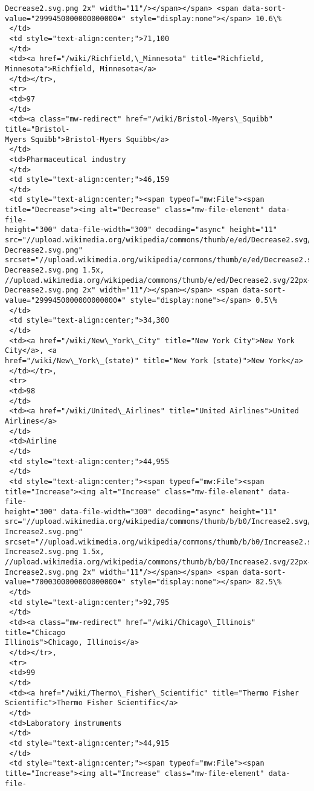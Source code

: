 \documentclass[11pt]{article}
\begin{document}
\begin{tcolorbox}[breakable, size=fbox, boxrule=.5pt, pad at break*=1mm, opacityfill=0]
\begin{Verbatim}[commandchars=\\\{\}]
Decrease2.svg.png 2x" width="11"/></span></span> <span data-sort-
value="2999450000000000000♠" style="display:none"></span> 10.6\%
 </td>
 <td style="text-align:center;">71,100
 </td>
 <td><a href="/wiki/Richfield,\_Minnesota" title="Richfield,
Minnesota">Richfield, Minnesota</a>
 </td></tr>,
 <tr>
 <td>97
 </td>
 <td><a class="mw-redirect" href="/wiki/Bristol-Myers\_Squibb" title="Bristol-
Myers Squibb">Bristol-Myers Squibb</a>
 </td>
 <td>Pharmaceutical industry
 </td>
 <td style="text-align:center;">46,159
 </td>
 <td style="text-align:center;"><span typeof="mw:File"><span
title="Decrease"><img alt="Decrease" class="mw-file-element" data-file-
height="300" data-file-width="300" decoding="async" height="11"
src="//upload.wikimedia.org/wikipedia/commons/thumb/e/ed/Decrease2.svg/11px-
Decrease2.svg.png"
srcset="//upload.wikimedia.org/wikipedia/commons/thumb/e/ed/Decrease2.svg/17px-
Decrease2.svg.png 1.5x,
//upload.wikimedia.org/wikipedia/commons/thumb/e/ed/Decrease2.svg/22px-
Decrease2.svg.png 2x" width="11"/></span></span> <span data-sort-
value="2999450000000000000♠" style="display:none"></span> 0.5\%
 </td>
 <td style="text-align:center;">34,300
 </td>
 <td><a href="/wiki/New\_York\_City" title="New York City">New York City</a>, <a
href="/wiki/New\_York\_(state)" title="New York (state)">New York</a>
 </td></tr>,
 <tr>
 <td>98
 </td>
 <td><a href="/wiki/United\_Airlines" title="United Airlines">United Airlines</a>
 </td>
 <td>Airline
 </td>
 <td style="text-align:center;">44,955
 </td>
 <td style="text-align:center;"><span typeof="mw:File"><span
title="Increase"><img alt="Increase" class="mw-file-element" data-file-
height="300" data-file-width="300" decoding="async" height="11"
src="//upload.wikimedia.org/wikipedia/commons/thumb/b/b0/Increase2.svg/11px-
Increase2.svg.png"
srcset="//upload.wikimedia.org/wikipedia/commons/thumb/b/b0/Increase2.svg/17px-
Increase2.svg.png 1.5x,
//upload.wikimedia.org/wikipedia/commons/thumb/b/b0/Increase2.svg/22px-
Increase2.svg.png 2x" width="11"/></span></span> <span data-sort-
value="7000300000000000000♠" style="display:none"></span> 82.5\%
 </td>
 <td style="text-align:center;">92,795
 </td>
 <td><a class="mw-redirect" href="/wiki/Chicago\_Illinois" title="Chicago
Illinois">Chicago, Illinois</a>
 </td></tr>,
 <tr>
 <td>99
 </td>
 <td><a href="/wiki/Thermo\_Fisher\_Scientific" title="Thermo Fisher
Scientific">Thermo Fisher Scientific</a>
 </td>
 <td>Laboratory instruments
 </td>
 <td style="text-align:center;">44,915
 </td>
 <td style="text-align:center;"><span typeof="mw:File"><span
title="Increase"><img alt="Increase" class="mw-file-element" data-file-

\end{Verbatim}
\end{tcolorbox}
\end{document}
